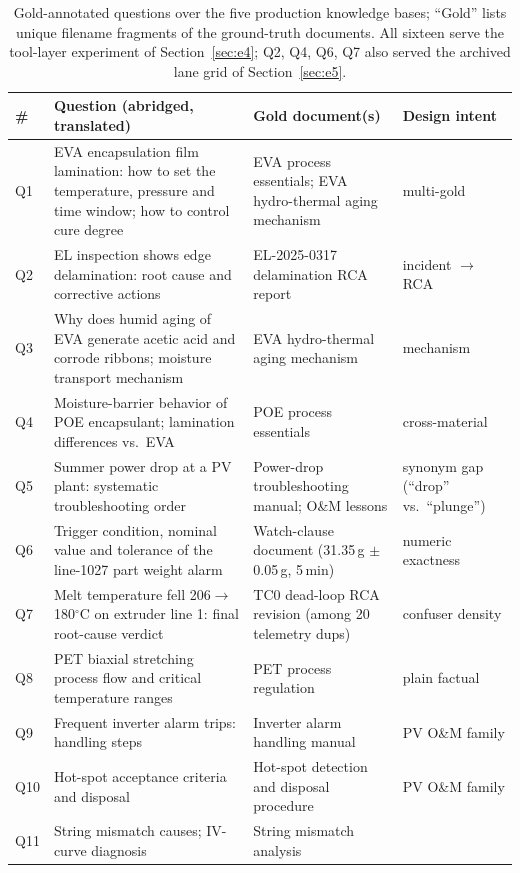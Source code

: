 \begin{table}[t]
\centering
\scriptsize
\setlength{\tabcolsep}{3pt}
\caption{Gold-annotated questions over the five production knowledge bases;
``Gold'' lists unique filename fragments of the ground-truth documents.
All sixteen serve the tool-layer experiment of
Section~\ref{sec:e4}; Q2, Q4, Q6, Q7 also served the archived lane grid
of Section~\ref{sec:e5}.}
\label{tab:questions}
\begin{tabular}{@{}l>{\raggedright\arraybackslash}p{7.3cm}>{\raggedright\arraybackslash}p{4.4cm}>{\raggedright\arraybackslash}p{3.5cm}@{}}
\toprule
\# & Question (abridged, translated) & Gold document(s) & Design intent \\
\midrule
Q1 & EVA encapsulation film lamination: how to set the temperature, pressure
and time window; how to control cure degree & EVA process essentials; EVA
hydro-thermal aging mechanism & multi-gold \\
Q2 & EL inspection shows edge delamination: root cause and corrective
actions & EL-2025-0317 delamination RCA report & incident $\to$ RCA \\
Q3 & Why does humid aging of EVA generate acetic acid and corrode ribbons;
moisture transport mechanism & EVA hydro-thermal aging mechanism & mechanism \\
Q4 & Moisture-barrier behavior of POE encapsulant; lamination differences
vs.\ EVA & POE process essentials & cross-material \\
Q5 & Summer power drop at a PV plant: systematic troubleshooting order &
Power-drop troubleshooting manual; O\&M lessons & synonym gap
(``drop'' vs.\ ``plunge'') \\
Q6 & Trigger condition, nominal value and tolerance of the line-1027 part
weight alarm & Watch-clause document (31.35\,g $\pm$0.05\,g, 5\,min) &
numeric exactness \\
Q7 & Melt temperature fell 206$\to$180$^\circ$C on extruder line 1: final
root-cause verdict & TC0 dead-loop RCA revision (among 20 telemetry dups) &
confuser density \\
Q8 & PET biaxial stretching process flow and critical temperature ranges &
PET process regulation & plain factual \\
Q9 & Frequent inverter alarm trips: handling steps & Inverter alarm handling
manual & PV O\&M family \\
Q10 & Hot-spot acceptance criteria and disposal & Hot-spot detection and
disposal procedure & PV O\&M family \\
Q11 & String mismatch causes; IV-curve diagnosis & String mismatch analysis

\end{tabular}
\end{table}
